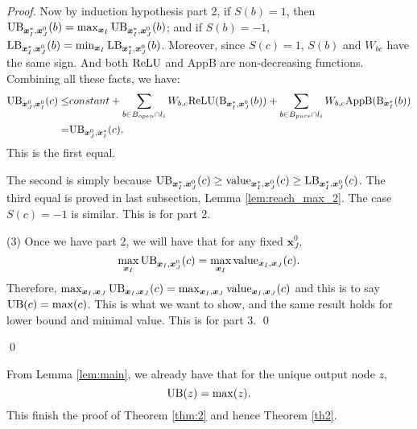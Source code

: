 \begin{proof}
					Now by induction hypothesis part 2, if $S(b)=1$, then $\mathrm{UB}_{\boldsymbol{x}^*_I,\boldsymbol{x}^0_J}(b)=\max_{\boldsymbol{x}_I}\mathrm{UB}_{\boldsymbol{x}^*_I,\boldsymbol{x}^0_J}(b)$; and if $S(b)=-1$, $\mathrm{LB}_{\boldsymbol{x}^*_I,\boldsymbol{x}^0_J}(b)=\min_{\boldsymbol{x}_I}\mathrm{LB}_{\boldsymbol{x}^*_I,\boldsymbol{x}^0_J}(b)$. Moreover, since $S(c)=1$, $S(b)$ and $W_{bc}$ have the same sign. And both $\mathrm{ReLU}$ and $\mathrm{AppB}$ are non-decreasing functions. Combining all these facts, we have:\begin{align*}
						\mathrm{UB}_{\boldsymbol{x}^0_J,\boldsymbol{x}^0_I}(c)\leq 
						&constant + \sum_{b\in B_{open}\cap l_i} W_{b,c}\mathrm{ReLU}(\mathrm{B}_{\boldsymbol{x}^*_I,\boldsymbol{x}^0_J}(b)) + \sum_{b\in B_{pure}\cap l_{i}} W_{b,c} \mathrm{AppB}(\mathrm{B}_{\boldsymbol{x}^*_I}(b))\\
						= & \mathrm{UB}_{\boldsymbol{x}^0_J,\boldsymbol{x}^*_I}(c). 
					\end{align*}  This is the first equal.
					
					The second is simply because $\mathrm{UB}_{\boldsymbol{x}^*_I,\boldsymbol{x}^0_J}(c)\geq {\textrm{value}}_{\boldsymbol{x}^*_I,\boldsymbol{x}^0_J}(c)\geq\mathrm{LB}_{\boldsymbol{x}^*_I,\boldsymbol{x}^0_J}(c)$.	The third equal is proved in last subsection, Lemma \ref{lem:reach_max_2}. The case $S(c)=-1$ is similar. This is for part 2.
					
					(3) Once we have part 2, we will have that for any fixed $\boldsymbol{x}^0_J$, $$\max_{\boldsymbol{x}_I} \mathrm{UB}_{\boldsymbol{x}_I,\boldsymbol{x}^0_J}(c)= \max_{\boldsymbol{x}_I} {\textrm{value}}_{\boldsymbol{x}_I,\boldsymbol{x}_J}(c).$$ Therefore, $\max_{\boldsymbol{x}_I,\boldsymbol{x}_J} \mathrm{UB}_{\boldsymbol{x}_I,\boldsymbol{x}_J}(c)= \max_{\boldsymbol{x}_I,\boldsymbol{x}_J} {\textrm{value}}_{\boldsymbol{x}_I,\boldsymbol{x}_J}(c)$ and this is to say $\mathrm{UB}(c)=\max(c)$. This is what we want to show, and the same result holds for lower bound and minimal value. This is for part 3. \qed
					
					
					
					\qed
				\end{proof}
				
				From Lemma \ref{lem:main}, we already have that for the unique output node $z$, $$\mathrm{UB}(z)=\max(z).$$ This finish the proof of Theorem \ref{thm:2} and hence Theorem \ref{th2}.
				
				
